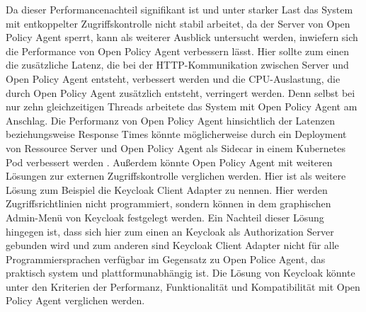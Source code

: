 Da dieser Performancenachteil signifikant ist und unter starker Last das System mit entkoppelter Zugriffskontrolle nicht stabil arbeitet, da der Server von Open Policy Agent sperrt, kann als weiterer Ausblick untersucht werden, inwiefern sich die Performance von Open Policy Agent verbessern lässt. Hier sollte zum einen die zusätzliche Latenz, die bei der HTTP-Kommunikation zwischen Server und Open Policy Agent entsteht, verbessert werden und die CPU-Auslastung, die durch Open Policy Agent zusätzlich entsteht, verringert werden. Denn selbst bei nur zehn gleichzeitigen Threads arbeitete das System mit Open Policy Agent am Anschlag. Die Performanz von Open Policy Agent hinsichtlich der Latenzen beziehungsweise Response Times könnte möglicherweise durch ein Deployment von Ressource Server und Open Policy Agent als Sidecar in einem Kubernetes Pod verbessert werden \citep{sidecar:2017}. Außerdem könnte Open Policy Agent mit weiteren Lösungen zur externen Zugriffskontrolle verglichen werden. Hier ist als weitere Lösung zum Beispiel die Keycloak Client Adapter zu nennen. Hier werden Zugriffsrichtlinien nicht programmiert, sondern können in dem graphischen Admin-Menü von Keycloak festgelegt werden. Ein Nachteil dieser Lösung hingegen ist, dass sich hier zum einen an Keycloak als Authorization Server gebunden wird und zum anderen sind Keycloak Client Adapter nicht für alle Programmiersprachen verfügbar im Gegensatz zu Open Police Agent, das praktisch system und plattformunabhängig ist. Die Lösung von Keycloak könnte unter den Kriterien der Performanz, Funktionalität und Kompatibilität mit Open Policy Agent verglichen werden.

